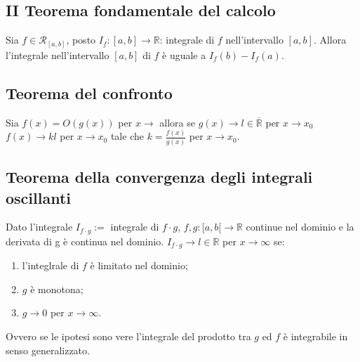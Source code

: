 \documentclass{article}
\begin{document}
\subsection{II Teorema fondamentale del calcolo}

Sia $f \in \mathcal{R}_{[a,b]}$, posto $I_f:[a,b]\rightarrow \mathbb{R}$: integrale di $f$ nell'intervallo $[a,b]$. Allora l'integrale nell'intervallo $[a,b]$ di $f$ è uguale a $I_f(b)-I_f(a)$.

\subsection{Teorema del confronto}

Sia $f(x)=O(g(x))$ per $x\rightarrow$ allora se $g(x)\rightarrow l\in \mathbb{\overline R}$ per $x\rightarrow x_0$ $f(x)\rightarrow kl$ per $x\rightarrow x_0$ tale che $k=\frac{f(x)}{g(x)}$ per $x\rightarrow x_0$.

\subsection{Teorema della convergenza degli integrali oscillanti}

Dato l'integrale $I_{f\cdot g}:=$ integrale di $f\cdot g$, $f,g:[a,b[\rightarrow \mathbb{R}$ continue nel dominio e la derivata di g è continua nel dominio. $I_{f\cdot g}\rightarrow l\in \mathbb{R}$ per $x\rightarrow \infty$ se:
\begin{enumerate}
	\item l'integlrale di $f$ è limitato nel dominio;

	\item $g$ è monotona;

	\item $g\rightarrow 0$ per $x\rightarrow \infty$.
\end{enumerate}

Ovvero se le ipotesi sono vere l'integrale del prodotto tra $g$ ed $f$ è integrabile in senso generalizzato.
\end{document}

